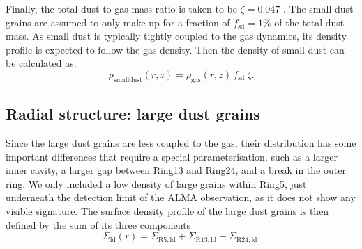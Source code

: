 \documentclass[fleqn,usenatbib,useAMS]{mnras}
\begin{document}
Finally, the total dust-to-gas mass ratio is taken to be $\zeta = 0.047$ \citep[as in][]{Rosenfeld_2013}. The small dust grains are assumed to only make up for a fraction of $f_\mathrm{sd}=1\%$ of the total dust mass. As small dust is typically tightly coupled to the gas dynamics, its density profile is expected to follow the gas density. Then the density of small dust can be calculated as:
\begin{equation}
\rho_{\mathrm{small dust}}(r,z)=\rho_{\mathrm{gas}}(r,z)\, f_{\mathrm{sd}} \: \zeta .
\end{equation}

\subsection{Radial structure: large dust grains}

Since the large dust grains are less coupled to the gas, their distribution has some important differences that require a special parameterisation, such as a larger inner cavity, a larger gap between Ring13 and Ring24, and a break in the outer ring. We only included a low density of large grains within Ring5, just underneath the detection limit of the ALMA observation, as it does not show any visible signature. The surface density profile of the large dust grains is then defined by the sum of its three components
\begin{equation}
  \Sigma_{\mathrm{ld}}(r) = \Sigma_{\mathrm{R5,ld}} + 
  \Sigma_{\mathrm{R13,ld}} + \Sigma_{\mathrm{R24,ld}}.
\end{equation}
\end{document}
